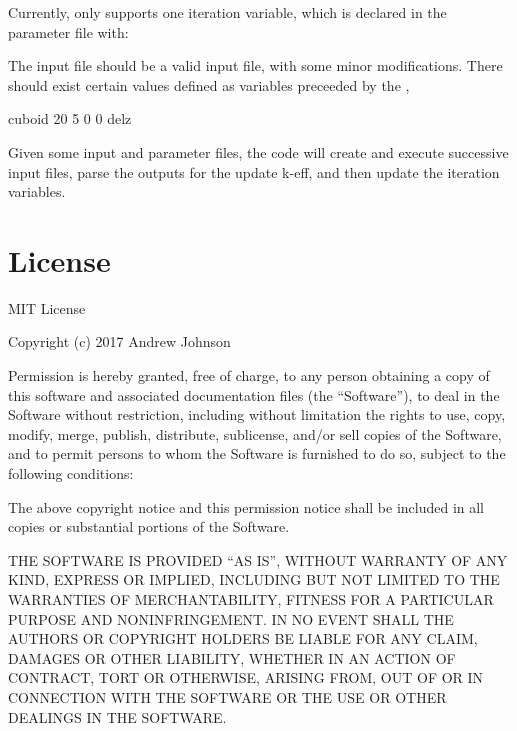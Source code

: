 \documentclass[letterpaper,10pt,english]{sphinxmanual}
\begin{document}
Currently,  only supports one iteration variable, which is declared in the parameter file with:

\begin{sphinxVerbatim}[commandchars=\\\{\}]
    
\end{sphinxVerbatim}

The input file should be a valid  input file, with some minor modifications.
There should exist certain values defined as variables preceeded by the ,

\begin{sphinxVerbatim}[commandchars=\\\{\}]
cuboid 20 5   0  0 \PYGZhy{}\PYGZdl{}del\PYGZus{}z
\end{sphinxVerbatim}

Given some input and parameter files, the code will create and execute successive input files,
parse the outputs for the update k-eff, and then update the iteration variables.


\section{License}
\label{\detokenize{intro:license}}\label{\detokenize{intro:id3}}
MIT License

Copyright (c) 2017 Andrew Johnson

Permission is hereby granted, free of charge, to any person obtaining a copy
of this software and associated documentation files (the ``Software''), to deal
in the Software without restriction, including without limitation the rights
to use, copy, modify, merge, publish, distribute, sublicense, and/or sell
copies of the Software, and to permit persons to whom the Software is
furnished to do so, subject to the following conditions:

The above copyright notice and this permission notice shall be included in all
copies or substantial portions of the Software.

THE SOFTWARE IS PROVIDED ``AS IS'', WITHOUT WARRANTY OF ANY KIND, EXPRESS OR
IMPLIED, INCLUDING BUT NOT LIMITED TO THE WARRANTIES OF MERCHANTABILITY,
FITNESS FOR A PARTICULAR PURPOSE AND NONINFRINGEMENT. IN NO EVENT SHALL THE
AUTHORS OR COPYRIGHT HOLDERS BE LIABLE FOR ANY CLAIM, DAMAGES OR OTHER
LIABILITY, WHETHER IN AN ACTION OF CONTRACT, TORT OR OTHERWISE, ARISING FROM,
OUT OF OR IN CONNECTION WITH THE SOFTWARE OR THE USE OR OTHER DEALINGS IN THE
SOFTWARE.
\end{document}
